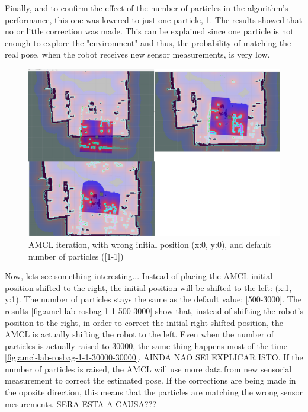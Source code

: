 Finally, and to confirm the effect of the number of particles in the algorithm's performance, this one was lowered to just one particle, \ref{fig:amcl-lab-rosbag--1--1-1-1}. The results showed that no or little correction was made. This can be explained since one particle is not enough to explore the "environment" and thus, the probability of matching the real pose, when the robot receives new sensor measurements, is very low. 

\begin{figure}
    \centering
    \includegraphics[width=1\linewidth]{amcl-lab-rosbag--1--1-1-1.png}
        \caption{AMCL iteration, with wrong initial position (x:0, y:0), and default number of particles ([1-1])}
    \label{fig:amcl-lab-rosbag--1--1-1-1}
\end{figure}

Now, lets see something interesting... Instead of placing the AMCL initial position shifted to the right, the initial position will be shifted to the left: (x:1, y:1). The number of particles stays the same as the default value: [500-3000]. The results \ref{fig:amcl-lab-rosbag-1-1-500-3000} show that, instead of shifting the robot's position to the right, in order to correct the initial right shifted position, the AMCL is actually shifting the robot to the left. Even when the number of particles is actually raised to 30000, the same thing happens most of the time \ref{fig:amcl-lab-rosbag-1-1-30000-30000}. {AINDA NAO SEI EXPLICAR ISTO}. If the number of particles is raised, the AMCL will use more data from new sensorial measurement to correct the estimated pose. If the corrections are being made in the oposite direction, this means that the particles are matching the wrong sensor mesurements. {SERA ESTA A CAUSA???}

